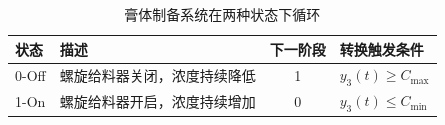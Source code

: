 \begin{table}[]
    \centering
    \caption{膏体制备系统在两种状态下循环}
    \label{tab:paste_dfa}
    \begin{tabular}{llcl}
    \toprule
       状态                  &    描述             & 下一阶段 & 转换触发条件                                   \\ 
       \hline
    0-Off                       & 螺旋给料器关闭，浓度持续降低                             & 1          & $y_3(t)\geq C_{\max}$                                \\
    1-On                       & 螺旋给料器开启，浓度持续增加                                   & 0          & $y_3(t)\leq C_{\min}$                                \\
    \bottomrule
    \end{tabular}
\end{table}




